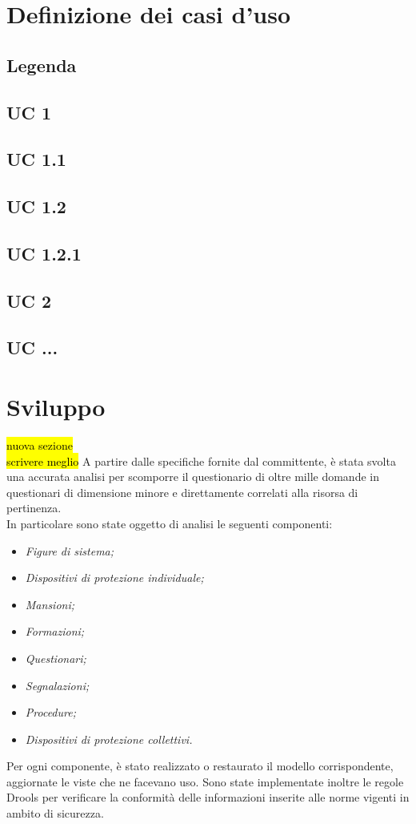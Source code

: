 \section{Definizione dei casi d'uso}
	\subsection{Legenda}
	\subsection{UC 1}
	\subsection{UC 1.1}
	\subsection{UC 1.2}
	\subsection{UC 1.2.1}
	\subsection{UC 2}	
	\subsection{UC ...}

\section{Sviluppo}
\hl{nuova sezione} \\
\hl{scrivere meglio}
A partire dalle specifiche fornite dal committente, è stata svolta una accurata analisi per scomporre il questionario di oltre mille domande in questionari di dimensione minore e direttamente correlati alla risorsa di pertinenza.\\
In particolare sono state oggetto di analisi le seguenti componenti:
\begin{itemize}
	\item \textit{Figure di sistema;}
	\item \textit{Dispositivi di protezione individuale;}
	\item \textit{Mansioni;}
	\item \textit{Formazioni;}
	\item \textit{Questionari;}
	\item \textit{Segnalazioni;}
	\item \textit{Procedure;}
	\item \textit{Dispositivi di protezione collettivi.}
\end{itemize}
Per ogni componente, è stato realizzato o restaurato il modello corrispondente, aggiornate le viste che ne facevano uso. Sono state implementate inoltre le regole Drools per verificare la conformità delle informazioni inserite alle norme vigenti in ambito di sicurezza.
